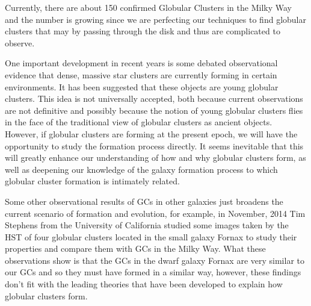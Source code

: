 Currently, there are about 150 confirmed Globular Clusters in the Milky Way and the number is growing since we are perfecting our techniques to find globular clusters that may by passing through the disk and thus are complicated to observe.

One important development in recent years is some debated observational evidence that dense, massive star clusters are currently forming in certain environments. It has been suggested that these objects are young globular clusters. This idea is not universally accepted, both because current observations are not definitive and possibly because the notion of young globular clusters flies in the face of the traditional view of globular clusters as ancient objects. However, if globular clusters are forming at the present epoch, we will have the opportunity to study the formation process directly. It seems inevitable that this will greatly enhance our understanding of how and why globular clusters form, as well as deepening our knowledge of the galaxy formation process to which globular cluster formation is intimately related.

Some other observational results of GCs in other galaxies just broadens the current scenario of formation and evolution, for example, in November, 2014 Tim Stephens from the University of California studied some images taken by the HST of four globular clusters located in the small galaxy Fornax to study their properties and compare them with GCs in the Milky Way. What these observations show is that the GCs in the dwarf galaxy Fornax are very similar to our GCs and so they must have formed in a similar way, however, these findings don't fit with the leading theories that have been developed to explain how globular clusters form.   

